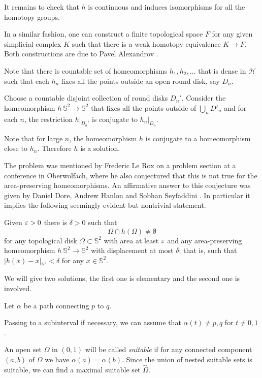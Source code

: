It remains to check that $h$ is continuous 
and induces isomorphisms for all the homotopy groups.
\qeds

In a similar fashion, one can construct a finite topological space $F$ for any given simplicial complex $K$ 
such that 
there is a weak homotopy equivalence $K\to F$.
Both constructions are due to Pavel Alexandrov
\cite{alexandrov-finite,mccord}.

Note that there is countable set of homeomorphisms $h_1,h_2,\dots$ that is dense in $\mathcal{H}$
such that
each $h_n$ fixes all the points outside an open round disk, say $D_n$.

Choose a countable disjoint collection of round disks $D_n'$.
Consider the homeomorphism $h\:\mathbb S^2\to \mathbb S^2$
that fixes all the points outside of $\bigcup_nD'_n$ and
for each $n$,
the restriction $h|_{D_n'}$ is conjugate to $h_n|_{D_n}$. 


Note that for large $n$, the homeomorphism $h$ is conjugate to a homeomorphism close to $h_n$.
Therefore $h$ is a solution.
\qeds

The problem was mentioned by Frederic Le Rox \cite{rox} on a problem section at a conference in Oberwolfach, 
where he also conjectured that this is not true for the area-preserving homeomorphisms.
An affirmative answer to this conjecture was given by Daniel Dore, Andrew Hanlon and Sobhan Seyfaddini 
\cite{dore-hanlon,seyfaddini}.
In particular it implies the following seemingly evident but nontrivial statement.

\begin{pr}
Given $\varepsilon>0$ there is $\delta>0$ such that 
\[\Omega\cap h(\Omega)\ne\emptyset\]
for any topological disk $\Omega\subset \mathbb{S}^2$ with area at least $\varepsilon$
and 
any area-preserving homeomorphism $h\:\mathbb{S}^2\to\mathbb{S}^2$ with displacement at most $\delta$;
that is, such that $|h(x)-x|_{\mathbb{S}^2}<\delta$ for any $x\in \mathbb{S}^2$. 
\end{pr}


We will give two solutions, the first one is elementary and the second one is involved. 

Let $\alpha$ be a path connecting $p$ to $q$.

Passing to a subinterval if necessary,
we can assume that $\alpha(t)\ne p,q$ for $t\ne0,1$.

An open set $\Omega$ in $(0,1)$ will be called {}\emph{suitable}
if for any connected component $(a,b)$ of $\Omega$ we have $\alpha(a)=\alpha(b)$.
Since the union of nested suitable sets is suitable, we can find a maximal suitable set $\hat \Omega$.

